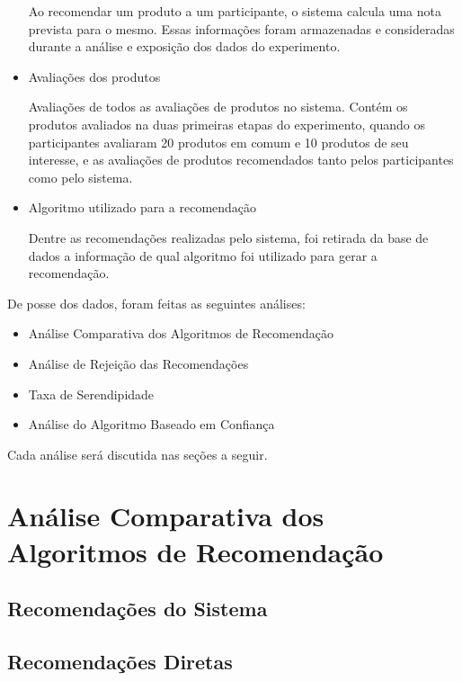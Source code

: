 \begin{itemize}
	\subitem Ao recomendar um produto a um participante, o sistema calcula uma nota prevista para o mesmo. Essas informações foram armazenadas e consideradas durante a análise e exposição dos dados do experimento.
	
	\item Avaliações dos produtos
	
	\subitem Avaliações de todos as avaliações de produtos no sistema. Contém os produtos avaliados na duas primeiras etapas do experimento, quando os participantes avaliaram 20 produtos em comum e 10 produtos de seu interesse, e as avaliações de produtos recomendados tanto pelos participantes como pelo sistema.
	
	\item Algoritmo utilizado para a recomendação
	
	\subitem Dentre as recomendações realizadas pelo sistema, foi retirada da base de dados a informação de qual algoritmo foi utilizado para gerar a recomendação.
	
\end{itemize}

 De posse dos dados, foram feitas as seguintes análises:
 
\begin{itemize}
	\item Análise Comparativa dos Algoritmos de Recomendação
	\item Análise de Rejeição das Recomendações
	\item Taxa de Serendipidade
	\item Análise do Algoritmo Baseado em Confiança
\end{itemize}

 Cada análise será discutida nas seções a seguir.
 
\section{Análise Comparativa dos Algoritmos de Recomendação}
\label{sec:analise_comparativa_dos_algoritmos_de_recomendacao}

 
 
\subsection{Recomendações do Sistema}

\subsection{Recomendações Diretas}


